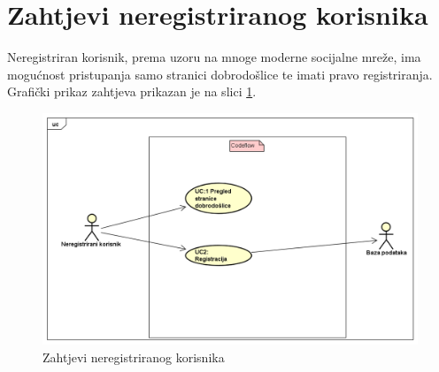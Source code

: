 \documentclass[times, utf8, zavrsni]{fer}
\begin{document}
\section{Zahtjevi neregistriranog korisnika}
Neregistriran korisnik, prema uzoru na mnoge moderne socijalne mreže, ima mogućnost pristupanja samo stranici dobrodošlice te imati pravo registriranja. Grafički prikaz zahtjeva prikazan je na slici \ref{fig:zahtjevi-nereg}.

\begin{figure}[H]
	\centering
	\includegraphics[width=14cm]{pictures/zahtjevi/nereg_korisnik.png}
	\caption{Zahtjevi neregistriranog korisnika}
	\label{fig:zahtjevi-nereg}
\end{figure}
\end{document}
